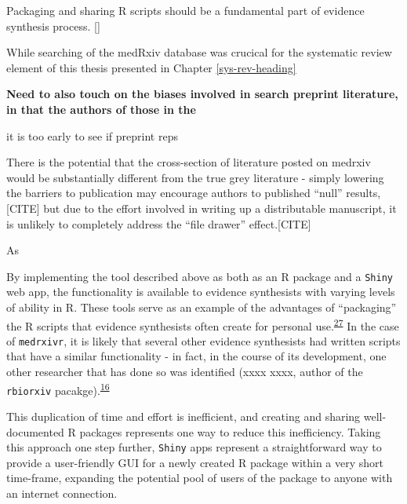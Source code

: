 \documentclass[a4paper, twoside]{templates/ociamthesis}
\begin{document}
Packaging and sharing R scripts should be a fundamental part of evidence synthesis process. {[}{]}

While searching of the medRxiv database was crucical for the systematic review element of this thesis presented in Chapter \ref{sys-rev-heading}

\textbf{Need to also touch on the biases involved in search preprint literature, in that the authors of those in the }

it is too early to see if preprint reps

There is the potential that the cross-section of literature posted on medrxiv would be substantially different from the true grey literature - simply lowering the barriers to publication may encourage authors to published ``null'' results,{[}CITE{]} but due to the effort involved in writing up a distributable manuscript, it is unlikely to completely address the ``file drawer'' effect.{[}CITE{]}

As

By implementing the tool described above as both as an R package and a \texttt{Shiny} web app, the functionality is available to evidence synthesists with varying levels of ability in R. These tools serve as an example of the advantages of ``packaging'' the R scripts that evidence synthesists often create for personal use.\textsuperscript{\protect\hyperlink{ref-wickham2015r}{27}} In the case of \texttt{medrxivr}, it is likely that several other evidence synthesists had written scripts that have a similar functionality - in fact, in the course of its development, one other researcher that has done so was identified (xxxx xxxx, author of the \texttt{rbiorxiv} pacakge).\textsuperscript{\protect\hyperlink{ref-rbiorxiv}{16}}

This duplication of time and effort is inefficient, and creating and sharing well-documented R packages represents one way to reduce this inefficiency. Taking this approach one step further, \texttt{Shiny} apps represent a straightforward way to provide a user-friendly GUI for a newly created R package within a very short time-frame, expanding the potential pool of users of the package to anyone with an internet connection.
\end{document}

